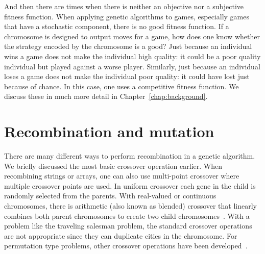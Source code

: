 And then there are times when there is neither an objective nor a subjective
fitness function. When applying genetic algorithms to games, especially games
that have a stochastic component, there is no good fitness function. If a
chromosome is designed to output moves for a game, how does one know whether
the strategy encoded by the chromosome is a good? Just because an individual
wins a game does not make the individual high quality: it could be a poor
quality individual but played against a worse player. Similarly, just because an
individual loses a game does not make the individual poor quality: it could have
lost just because of chance. In this case, one uses a competitive fitness
function. We discuss these in much more detail in Chapter~\ref{chap:background}.

\section{Recombination and mutation}

There are many different ways to perform recombination in a genetic algorithm.
We briefly discussed the most basic crossover operation earlier. When
recombining strings or arrays, one can also use multi-point crossover where
multiple crossover points are used. In uniform crossover each gene in the child
is randomly selected from the parents. With real-valued or continuous
chromosomes, there is arithmetic (also known as blended) crossover that linearly
combines both parent chromosomes to create two child
chromosomes~\cite{haupt2004practical}. With a problem like the traveling
salesman problem, the standard crossover operations are not appropriate since
they can duplicate cities in the chromosome. For permutation type problems,
other crossover operations have been developed~\cite{goldberg1989genetic}.
